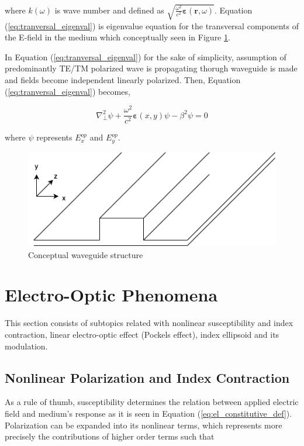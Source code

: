 \documentclass[thesis]{deutez}
\begin{document}
    where $k(\omega)$ is wave number and defined as $\sqrt{\frac{\omega^2}{c^2}\bm{\varepsilon}(\mathbf{r},\omega)}$. Equation (\ref{eq:tranversal_eigenval}) is eigenvalue equation for the transversal components of the E-field in the medium which conceptually seen in Figure \ref{fig:2dWGgeom}. 
    
    
    \newpage
    In Equation (\ref{eq:tranversal_eigenval}) for the sake of simplicity, assumption of predominantly TE/TM polarized wave is propagating thorugh waveguide is made and fields become independent linearly polarized. Then, Equation (\ref{eq:tranversal_eigenval}) becomes,

    \begin{equation}
        \nabla_{\perp}^2 \psi + \frac{\omega^2}{c^2}\bm{\varepsilon}(x,y) \psi - \beta^2  \psi = 0
        \label{eq:tranversal_eigenval_scalar}
    \end{equation}

    where $\psi$ represents $E_x^{op}$ and $E_y^{op}$. 
    
    \begin{figure}[h]
        \centering
        \includegraphics[width=0.5\linewidth]{2dWGgeom-2.png}
        \caption{Conceptual waveguide structure}
        \label{fig:2dWGgeom}
    \end{figure}
    
   
    
    \section{Electro-Optic Phenomena}
	\label{sec:electro-optic_phenomena}	
	
    This section consists of subtopics related with nonlinear susceptibility and index contraction, linear electro-optic effect (Pockels effect), index ellipsoid and its modulation. 

    \subsection{Nonlinear Polarization and Index Contraction}

     As a rule of thumb, susceptibility determines the relation between applied electric field and medium's response as it is seen in Equation (\ref{eq:el_constitutive_def}). Polarization can be expanded into its nonlinear terms, which represents more precisely the contributions of higher order terms such that
\end{document}
